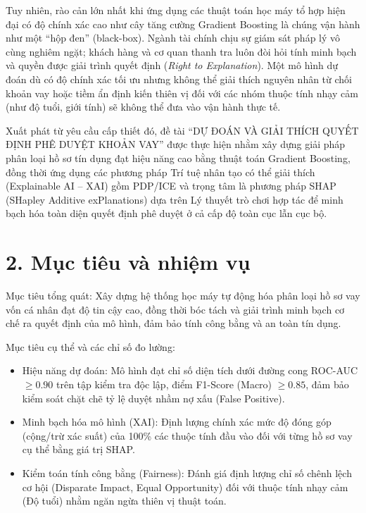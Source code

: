 \documentclass[12pt,a4paper,oneside]{report}
\newcommand{\tendetai}{DỰ ĐOÁN VÀ GIẢI THÍCH QUYẾT ĐỊNH PHÊ DUYỆT KHOẢN VAY}
\begin{document}
Tuy nhiên, rào cản lớn nhất khi ứng dụng các thuật toán học máy tổ hợp hiện đại có độ chính xác cao như cây tăng cường Gradient Boosting là chúng vận hành như một ``hộp đen'' (black-box). Ngành tài chính chịu sự giám sát pháp lý vô cùng nghiêm ngặt; khách hàng và cơ quan thanh tra luôn đòi hỏi tính minh bạch và quyền được giải trình quyết định (\textit{Right to Explanation}). Một mô hình dự đoán dù có độ chính xác tối ưu nhưng không thể giải thích nguyên nhân từ chối khoản vay hoặc tiềm ẩn định kiến thiên vị đối với các nhóm thuộc tính nhạy cảm (như độ tuổi, giới tính) sẽ không thể đưa vào vận hành thực tế. 

Xuất phát từ yêu cầu cấp thiết đó, đề tài {``\tendetai''} được thực hiện nhằm xây dựng giải pháp phân loại hồ sơ tín dụng đạt hiệu năng cao bằng thuật toán {Gradient Boosting}, đồng thời ứng dụng các phương pháp Trí tuệ nhân tạo có thể giải thích (Explainable AI -- XAI) gồm {PDP/ICE} và trọng tâm là phương pháp {SHAP} (SHapley Additive exPlanations) dựa trên Lý thuyết trò chơi hợp tác để minh bạch hóa toàn diện quyết định phê duyệt ở cả cấp độ toàn cục lẫn cục bộ.

\section*{2. Mục tiêu và nhiệm vụ}
{Mục tiêu tổng quát:} Xây dựng hệ thống học máy tự động hóa phân loại hồ sơ vay vốn cá nhân đạt độ tin cậy cao, đồng thời bóc tách và giải trình minh bạch cơ chế ra quyết định của mô hình, đảm bảo tính công bằng và an toàn tín dụng.

{Mục tiêu cụ thể và các chỉ số đo lường:}
\begin{itemize}
    \item {Hiệu năng dự đoán:} Mô hình đạt chỉ số diện tích dưới đường cong ROC-AUC $\ge 0.90$ trên tập kiểm tra độc lập, điểm F1-Score (Macro) $\ge 0.85$, đảm bảo kiểm soát chặt chẽ tỷ lệ duyệt nhầm nợ xấu (False Positive).
    \item {Minh bạch hóa mô hình (XAI):} Định lượng chính xác mức độ đóng góp (cộng/trừ xác suất) của 100\% các thuộc tính đầu vào đối với từng hồ sơ vay cụ thể bằng giá trị SHAP.
    \item {Kiểm toán tính công bằng (Fairness):} Đánh giá định lượng chỉ số chênh lệch cơ hội (Disparate Impact, Equal Opportunity) đối với thuộc tính nhạy cảm (Độ tuổi) nhằm ngăn ngừa thiên vị thuật toán.
\end{itemize}
\end{document}
